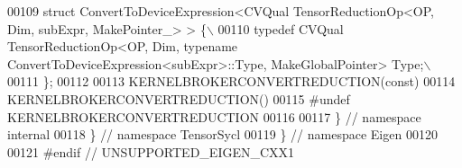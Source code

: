 \begin{DoxyCode}
00109 \textcolor{preprocessor}{struct ConvertToDeviceExpression<CVQual TensorReductionOp<OP, Dim, subExpr, MakePointer\_> > \{\(\backslash\)}
00110 \textcolor{preprocessor}{  typedef CVQual TensorReductionOp<OP, Dim, typename ConvertToDeviceExpression<subExpr>::Type,
       MakeGlobalPointer> Type;\(\backslash\)}
00111 \textcolor{preprocessor}{\};}
00112 
00113 KERNELBROKERCONVERTREDUCTION(\textcolor{keyword}{const})
00114 KERNELBROKERCONVERTREDUCTION()
00115 \textcolor{preprocessor}{#undef KERNELBROKERCONVERTREDUCTION}
00116 
00117 \}  \textcolor{comment}{// namespace internal}
00118 \}  \textcolor{comment}{// namespace TensorSycl}
00119 \}  \textcolor{comment}{// namespace Eigen}
00120 
00121 \textcolor{preprocessor}{#endif  // UNSUPPORTED\_EIGEN\_CXX1}
\end{DoxyCode}
